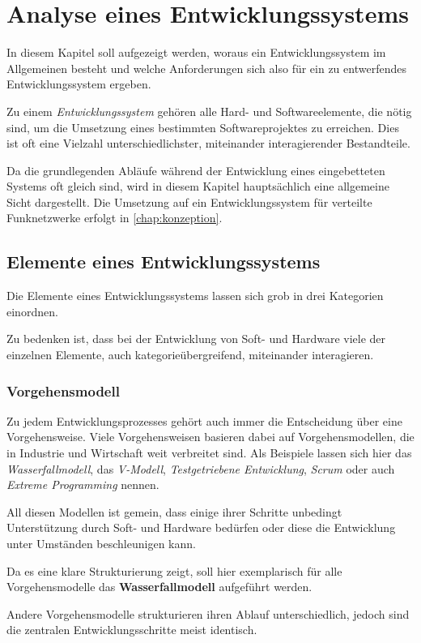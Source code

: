 \chapter{Analyse eines Entwicklungssystems}\label{chap:analyse}
\minitoc
In diesem Kapitel soll aufgezeigt werden, woraus ein Entwicklungssystem
im Allgemeinen besteht und welche Anforderungen sich also für ein zu
entwerfendes Entwicklungssystem ergeben.
\begin{definition}[Entwicklungssystem]
Zu einem \emph{Entwicklungssystem} gehören
alle Hard- und Softwareelemente, die nötig sind, um die Umsetzung eines
bestimmten Softwareprojektes zu erreichen. Dies ist oft eine Vielzahl
unterschiedlichster, miteinander interagierender Bestandteile.
\end{definition}
Da die grundlegenden Abläufe während der Entwicklung eines eingebetteten
Systems oft gleich sind, wird in diesem Kapitel hauptsächlich eine allgemeine
Sicht dargestellt. Die Umsetzung auf ein Entwicklungssystem für verteilte
Funknetzwerke erfolgt in \autoref{chap:konzeption}.
\clearpage
\section{Elemente eines Entwicklungssystems}
Die Elemente eines Entwicklungssystems lassen sich grob in drei Kategorien
einordnen. 

Zu bedenken ist, dass bei der Entwicklung von Soft- und Hardware viele der
einzelnen Elemente, auch kategorieübergreifend, miteinander interagieren. 
\subsection{Vorgehensmodell}
Zu jedem Entwicklungsprozesses gehört auch immer die Entscheidung über eine
Vorgehensweise. Viele Vorgehensweisen basieren dabei auf Vorgehensmodellen,
die in Industrie und Wirtschaft weit verbreitet sind. Als Beispiele lassen sich
hier das \emph{Wasserfallmodell}, das \emph{V-Modell},
\emph{Testgetriebene Entwicklung}, \emph{Scrum} oder auch \emph{Extreme
Programming} nennen.

All diesen Modellen ist gemein, dass einige ihrer Schritte
unbedingt Unterstützung durch Soft- und Hardware bedürfen oder
diese die Entwicklung unter Umständen beschleunigen kann.

Da es eine klare Strukturierung zeigt, soll hier exemplarisch für alle
Vorgehensmodelle das \textbf{Wasserfallmodell} aufgeführt werden.

Andere Vorgehensmodelle strukturieren ihren Ablauf unterschiedlich, jedoch sind
die zentralen Entwicklungsschritte meist identisch.

